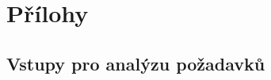 \documentclass[12pt,a4paper]{report}
\begin{document}
    


    \tableofcontents

    
    
    
    
    
    
    
    
    
    

    

    \listoffigures



    \appendix


    \chapter{Přílohy}\label{ch:prilohy}


    \section{Vstupy pro analýzu požadavků}\label{sec:analyza-pozadavku-prilohy}
\end{document}
